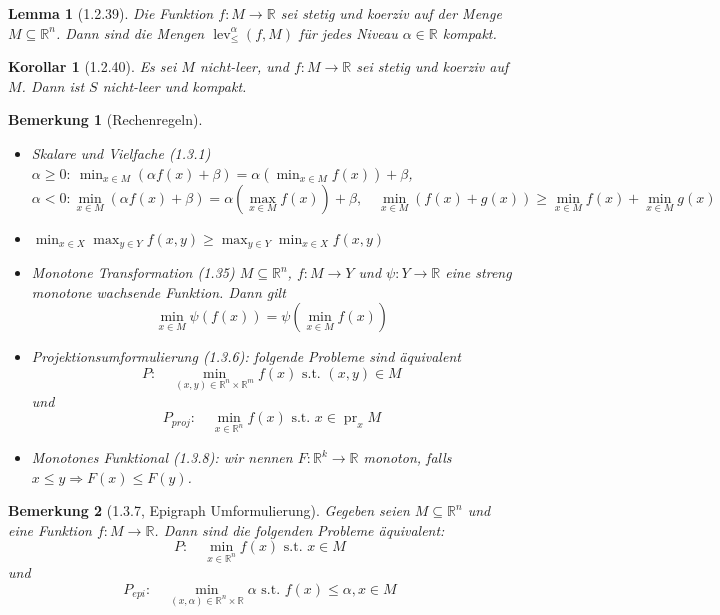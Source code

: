 \documentclass[12pt]{extreport} %
\newcommand{\R}{\mathbb{R}}
\theoremstyle{named}
\theoremstyle{nnamed}
\theoremstyle{itshape}
\theoremstyle{normal}
\newtheorem*{bemerkung}{Bemerkung}
\newtheorem*{korollar}{Korollar}
\newtheorem*{lemma}{Lemma}
\begin{document}
\begin{lemma}[1.2.39]
	Die Funktion $f \colon M \rightarrow \R$ sei stetig und koerziv auf der Menge $M \subseteq \R^n$. Dann sind die Mengen $\operatorname{lev}_{\leq}^{\alpha}(f, M)$ für jedes Niveau $\alpha \in \R$ kompakt.
\end{lemma}

\begin{korollar}[1.2.40]
	Es sei $M$ nicht-leer, und $f \colon M \rightarrow \R$ sei stetig und koerziv auf $M$. Dann ist $S$ nicht-leer und kompakt.
\end{korollar}
\begin{bemerkung}[Rechenregeln] ~\
	\begin{itemize}
		\item Skalare und Vielfache (1.3.1) $\alpha \geq 0: ~ \min_{x \in M} \left( \alpha f(x) + \beta \right) = \alpha \left( \min_{x \in M} f(x) \right) + \beta$,
			$$ \alpha < 0:  \min_{x \in M} \left( \alpha f(x) + \beta \right) = \alpha \left( \max_{x \in M } f(x) \right) + \beta, \quad \min_{x \in M} \left( f(x) + g(x) \right) \geq \min_{x \in M} f(x) + \min_{x \in M} g(x) $$
		\item $\min_{x \in X} \max_{y \in Y} f(x, y) \geq \max_{y \in Y} \min_{x \in X} f(x, y)$
		 \item Monotone Transformation (1.35) $M \subseteq \R^n$, $f \colon M \rightarrow Y$ und $\psi \colon Y \rightarrow \R$ eine streng monotone wachsende Funktion. Dann gilt
		 	$$ \min_{x \in M} \psi(f(x)) = \psi (\min_{x \in M} f(x)) $$
		 \item Projektionsumformulierung (1.3.6): folgende Probleme sind äquivalent
		 	$$ P: \quad \min_{(x,y) \in \R^n \times \R^m} f(x) \text{ s.t. } (x, y) \in M $$
		 	und
		 	$$ P_{proj}: \quad \min_{x \in \R^n} f(x) \text{ s.t. } x \in \operatorname{pr}_x M $$
		 \item Monotones Funktional (1.3.8): wir nennen $F \colon \R^k \rightarrow \R$ monoton, falls $x \leq y \Rightarrow F(x) \leq F(y)$.
	\end{itemize}
\end{bemerkung}

\begin{bemerkung}[1.3.7, Epigraph Umformulierung]
	Gegeben seien $M \subseteq \R^n$ und eine Funktion $f \colon M \rightarrow \R$. Dann sind die folgenden Probleme äquivalent:
	$$ P: \quad \min_{x \in \R^n} f(x) \text{ s.t. } x \in M $$
	und 
		$$ P_{epi}: \quad \min_{(x, \alpha) \in \R^n \times \R} \alpha \text{ s.t. } f(x) \leq \alpha, x\in M $$
\end{bemerkung}
\end{document}
